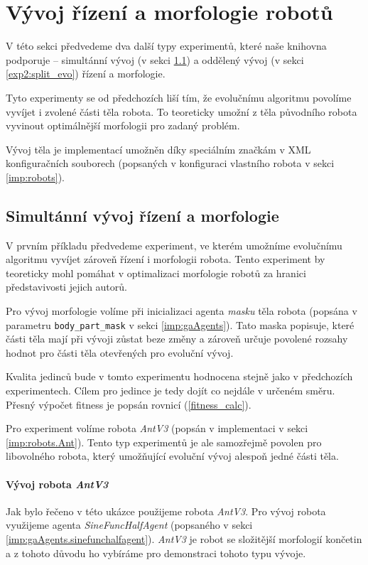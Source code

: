 \section{Vývoj řízení a morfologie robotů} \label{exp2}

V této sekci předvedeme dva další typy experimentů, které naše knihovna
podporuje -- simultánní vývoj (v sekci \ref{exp2:para_evo}) a oddělený
vývoj (v sekci \ref{exp2:split_evo}) řízení a morfologie.

Tyto experimenty se od předchozích liší tím, že evolučnímu algoritmu povolíme
vyvíjet i zvolené části těla robota. To teoreticky umožní z těla původního
robota vyvinout optimálnější morfologii pro zadaný problém.

Vývoj těla je implementací umožněn díky speciálním značkám v XML konfiguračních
souborech (popsaných v konfiguraci vlastního robota v sekci \ref{imp:robots}).

\subsection{Simultánní vývoj řízení a morfologie} \label{exp2:para_evo}

V prvním příkladu předvedeme experiment, ve kterém umožníme evolučnímu
algoritmu vyvíjet zároveň řízení i morfologii robota. Tento experiment by
teoreticky mohl pomáhat v optimalizaci morfologie robotů za hranici
představivosti jejich autorů. 

Pro vývoj morfologie volíme při inicializaci agenta \emph{masku} těla
robota (popsána v parametru \texttt{body\_part\_mask} v sekci
\ref{imp:gaAgents}). Tato maska popisuje, které části těla mají při vývoji
zůstat beze změny a zároveň určuje povolené rozsahy hodnot pro části
těla otevřených pro evoluční vývoj.

Kvalita jedinců bude v tomto experimentu hodnocena stejně jako v předchozích
experimentech. Cílem pro jedince je tedy dojít co nejdále v určeném směru.
Přesný výpočet fitness je popsán rovnicí (\ref{fitness_calc}). 

Pro experiment volíme robota \emph{AntV3} (popsán v implementaci v sekci
\ref{imp:robots.Ant}). Tento typ experimentů je ale samozřejmě povolen pro
libovolného robota, který umožňující evoluční vývoj alespoň jedné části těla.

\paragraph{Vývoj robota \emph{AntV3}}
Jak bylo řečeno v této ukázce použijeme robota \emph{AntV3}. Pro vývoj robota
využijeme agenta \emph{SineFuncHalfAgent} (popsaného v sekci
\ref{imp:gaAgents.sinefunchalfagent}). \emph{AntV3} je robot se složitější
morfologií končetin a z tohoto důvodu ho vybíráme pro demonstraci tohoto typu
vývoje.

